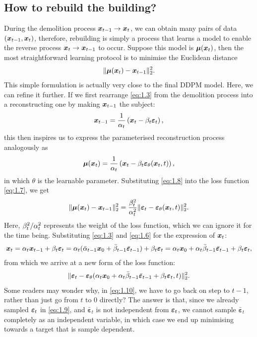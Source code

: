 \subsection{How to rebuild the building?}\label{chap_1:rebuild}

During the demolition process $\bm{x}_{t-1}\to\bm{x}_{t}$, we can obtain many pairs of data $(\bm{x}_{t-1},\bm{x}_{t})$, therefore, rebuilding is simply a process that learns a model to enable the reverse process $\bm{x}_{t}\to\bm{x}_{t-1}$ to occur. Suppose this model is $\bm{\mu}(\bm{x}_{t})$, then the most straightforward learning protocol is to minimise the Euclidean distance
\begin{equation}
    \label{eq:1.7}
    \|\bm{\mu}(\bm{x}_{t})-\bm{x}_{t-1}\|_2^2.
\end{equation}
This simple formulation is actually very close to the final DDPM model. Here, we can refine it further. If we first rearrange \cref{eq:1.3} from the demolition process into a reconstructing one by making $\bm{x}_{t-1}$ the subject:
\begin{equation*}
    \bm{x}_{t-1}=\frac{1}{\alpha_t}\left(\bm{x}_{t}-\beta_t\bm{\varepsilon}_t\right),
\end{equation*}
this then inspires us to express the parameterised reconstruction process analogously as
\begin{equation}
    \label{eq:1.8}
    \bm{\mu}(\bm{x}_{t})=\frac{1}{\alpha_t}\left(\bm{x}_{t}-\beta_t\bm{\varepsilon}_\theta(\bm{x}_{t},t)\right),
\end{equation}
in which $\theta$ is the learnable parameter. Substituting \cref{eq:1.8} into the loss function \cref{eq:1.7}, we get
\begin{equation}
    \label{eq:1.9}
    \|\bm{\mu}(\bm{x}_{t})-\bm{x}_{t-1}\|_2^2=\frac{\beta_t^2}{\alpha_t^2}\|\bm{\varepsilon}_t-\bm{\varepsilon}_\theta(\bm{x}_{t},t)\|_2^2.
\end{equation}
Here, $\beta_t^2/\alpha_t^2$ represents the weight of the loss function, which we can ignore it for the time being. Substituting  \cref{eq:1.3} and \cref{eq:1.6} for the expression of $\bm{x}_{t}$:
\begin{equation}
    \label{eq:1.10}    \bm{x}_{t}=\alpha_t\bm{x}_{t-1}+\beta_t\bm{\varepsilon}_t=\alpha_t(\bar{\alpha}_{t-1}\bm{x}_0+\bar{\beta}_{t-1}\bar{\bm{\varepsilon}}_{t-1})+\beta_t\bm{\varepsilon}_t=\alpha_t\bm{x}_0+\alpha_t\bar{\beta}_{t-1}\bar{\bm{\varepsilon}}_{t-1}+\beta_t\bm{\varepsilon}_t,
\end{equation}
from which we arrive at a new form of the loss function:
\begin{equation}
    \label{eq:1.11}
    \|\bm{\varepsilon}_t-\bm{\varepsilon}_\theta(\alpha_t\bm{x}_0+\alpha_t\bar{\beta}_{t-1}\bar{\bm{\varepsilon}}_{t-1}+\beta_t\bm{\varepsilon}_t,t) \|_2^2.
\end{equation}
Some readers may wonder why, in \cref{eq:1.10}, we have to go back on step to $t-1$, rather than just go from $t$ to 0 directly? 
The answer is that, since  we already sampled $\bm{\varepsilon}_t$ in \cref{eq:1.9}, and $\bar{\bm{\varepsilon}}_t$ is not independent from $\bm{\varepsilon}_t$, we cannot sample $\bar{\bm{\varepsilon}}_t$ completely as an independent variable, in which case we end up minimising towards a target that is sample dependent.

